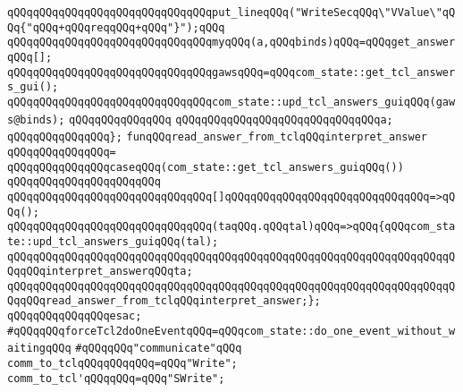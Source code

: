 \newline
\verb|qQQqqQQqqQQqqQQqqQQqqQQqqQQqqQQqput_lineqQQq("WriteSecqQQq\"VValue\"qQQq{"qQQq+qQQqreqqQQq+qQQq"}");qQQq|\newline
\verb|qQQqqQQqqQQqqQQqqQQqqQQqqQQqqQQqmyqQQq(a,qQQqbinds)qQQq=qQQqget_answerqQQq[];|\newline
\newline
\verb|qQQqqQQqqQQqqQQqqQQqqQQqqQQqqQQqgawsqQQq=qQQqcom_state::get_tcl_answers_gui();|\newline
\verb|qQQqqQQqqQQqqQQqqQQqqQQqqQQqqQQqcom_state::upd_tcl_answers_guiqQQq(gaws@binds);|\newline
\verb|qQQqqQQqqQQqqQQq|\newline
\verb|qQQqqQQqqQQqqQQqqQQqqQQqqQQqqQQqa;|\newline
\verb|qQQqqQQqqQQqqQQq};|\newline
\newline
\verb|funqQQqread_answer_from_tclqQQqinterpret_answer|\newline
\verb|qQQqqQQqqQQqqQQq=|\newline
\verb|qQQqqQQqqQQqqQQqcaseqQQq(com_state::get_tcl_answers_guiqQQq())|\newline
\verb|qQQqqQQqqQQqqQQqqQQqqQQq|\newline
\verb|qQQqqQQqqQQqqQQqqQQqqQQqqQQqqQQq[]qQQqqQQqqQQqqQQqqQQqqQQqqQQqqQQq=>qQQq();|\newline
\verb|qQQqqQQqqQQqqQQqqQQqqQQqqQQqqQQq(taqQQq.qQQqtal)qQQq=>qQQq{qQQqcom_state::upd_tcl_answers_guiqQQq(tal);|\newline
\verb|qQQqqQQqqQQqqQQqqQQqqQQqqQQqqQQqqQQqqQQqqQQqqQQqqQQqqQQqqQQqqQQqqQQqqQQqqQQqinterpret_answerqQQqta;|\newline
\verb|qQQqqQQqqQQqqQQqqQQqqQQqqQQqqQQqqQQqqQQqqQQqqQQqqQQqqQQqqQQqqQQqqQQqqQQqqQQqread_answer_from_tclqQQqinterpret_answer;};|\newline
\verb|qQQqqQQqqQQqqQQqesac;|\newline
\newline
\verb|#qQQqqQQqforceTcl2doOneEventqQQq=qQQqcom_state::do_one_event_without_waitingqQQq|\newline
\newline
\newline
\verb|#qQQqqQQq"communicate"qQQq|\newline
\newline
\verb|comm_to_tclqQQqqQQqqQQq=qQQq"Write";|\newline
\verb|comm_to_tcl'qQQqqQQq=qQQq"SWrite";|\newline
